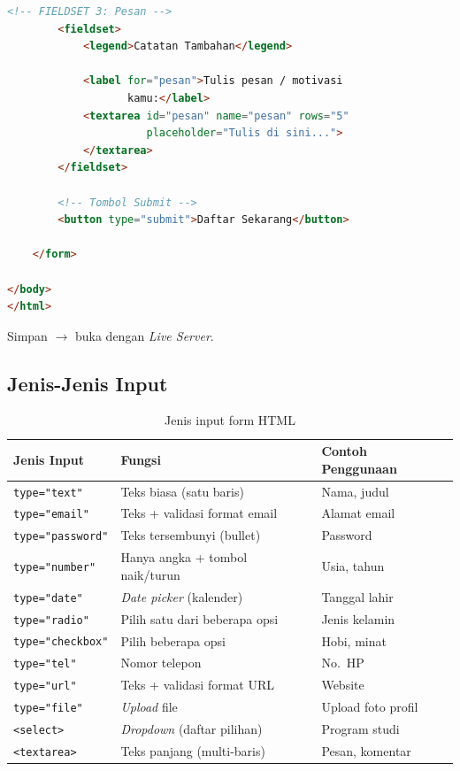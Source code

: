 \begin{lstlisting}[language=HTML, caption={Form pendaftaran akun}, label={lst:m04-form}]
        <!-- FIELDSET 3: Pesan -->
        <fieldset>
            <legend>Catatan Tambahan</legend>

            <label for="pesan">Tulis pesan / motivasi
                   kamu:</label>
            <textarea id="pesan" name="pesan" rows="5"
                      placeholder="Tulis di sini...">
            </textarea>
        </fieldset>

        <!-- Tombol Submit -->
        <button type="submit">Daftar Sekarang</button>

    </form>

</body>
</html>
\end{lstlisting}

Simpan $\rightarrow$ buka dengan \emph{Live Server}.

\subsection{Jenis-Jenis Input}

\begin{table}[ht]
\centering
\caption{Jenis input form HTML}
\label{tab:m04-input}
\small
\begin{tabular}{lp{3.5cm}p{5cm}}
\toprule
\textbf{Jenis Input} & \textbf{Fungsi} & \textbf{Contoh Penggunaan} \\
\midrule
\texttt{type="text"} & Teks biasa (satu baris) & Nama, judul \\
\texttt{type="email"} & Teks + validasi format email & Alamat email \\
\texttt{type="password"} & Teks tersembunyi (bullet) & Password \\
\texttt{type="number"} & Hanya angka + tombol naik/turun & Usia, tahun \\
\texttt{type="date"} & \emph{Date picker} (kalender) & Tanggal lahir \\
\texttt{type="radio"} & Pilih satu dari beberapa opsi & Jenis kelamin \\
\texttt{type="checkbox"} & Pilih beberapa opsi & Hobi, minat \\
\texttt{type="tel"} & Nomor telepon & No.\ HP \\
\texttt{type="url"} & Teks + validasi format URL & Website \\
\texttt{type="file"} & \emph{Upload} file & Upload foto profil \\
\texttt{<select>} & \emph{Dropdown} (daftar pilihan) & Program studi \\
\texttt{<textarea>} & Teks panjang (multi-baris) & Pesan, komentar \\
\bottomrule
\end{tabular}
\end{table}

